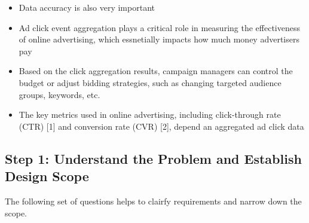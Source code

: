 \documentclass{report}
\theoremstyle{definition}
\let\oldsubsection\subsection
\renewcommand{\subsection}{\oldsubsection*}
\begin{document}
\begin{itemize}
\item
Data accuracy is also very important
\item
Ad click event aggregation plays a critical role in measuring the effectiveness of online advertising, which essnetially impacts how much money advertisers pay
\item
Based on the click aggregation results, campaign managers can control the budget or adjust bidding strategies, such as changing targeted audience groups, keywords, etc.
\item
The key metrics used in online advertising, including click-through rate (CTR) [1] and conversion rate (CVR) [2], depend an aggregated ad click data
\end{itemize}

\subsection{Step 1: Understand the Problem and Establish Design Scope}

The following set of questions helps to clairfy requirements and narrow down the scope.
\end{document}
